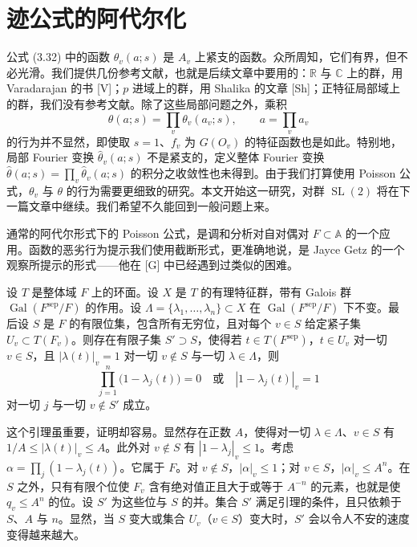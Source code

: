 \section{迹公式的阿代尔化}

公式 (3.32) 中的函数 $\theta_v(a;s)$ 是 $A_v$ 上紧支的函数。众所周知，它们有界，但不必光滑。我们提供几份参考文献，也就是后续文章中要用的：$\mathbb R$ 与 $\mathbb C$ 上的群，用 Varadarajan 的书 [V]；$p$ 进域上的群，用 Shalika 的文章 [Sh]；正特征局部域上的群，我们没有参考文献。除了这些局部问题之外，乘积
\[
\theta(a;s)=\prod_v\theta_v(a_v;s),\qquad a=\prod_va_v
\]
的行为并不显然，即使取 $s=1$、$f_v$ 为 $G(O_v)$ 的特征函数也是如此。特别地，局部 Fourier 变换 $\hat\theta_v(a;s)$ 不是紧支的，定义整体 Fourier 变换 $\hat\theta(a;s)=\prod_v\hat\theta_v(a;s)$ 的积分之收敛性也未得到。由于我们打算使用 Poisson 公式，$\theta_v$ 与 $\theta$ 的行为需要更细致的研究。本文开始这一研究，对群 $\operatorname{SL}(2)$ 将在下一篇文章中继续。我们希望不久能回到一般问题上来。

通常的阿代尔形式下的 Poisson 公式，是调和分析对自对偶对 $F\subset\mathbb A$ 的一个应用。函数的恶劣行为提示我们使用截断形式，更准确地说，是 Jayce Getz 的一个观察所提示的形式——他在 [G] 中已经遇到过类似的困难。

\begin{lemma}
\setcounter{theorem}{0}
设 $T$ 是整体域 $F$ 上的环面。设 $X$ 是 $T$ 的有理特征群，带有 Galois 群 $\operatorname{Gal}(F^{\mathrm{sep}}/F)$ 的作用。设 $\Lambda=\{\lambda_1,\dots,\lambda_n\}\subset X$ 在 $\operatorname{Gal}(F^{\mathrm{sep}}/F)$ 下不变。最后设 $S$ 是 $F$ 的有限位集，包含所有无穷位，且对每个 $v\in S$ 给定紧子集 $U_v\subset T(F_v)$。则存在有限子集 $S'\supset S$，使得若 $t\in T(F^{\mathrm{sep}})$，$t\in U_v$ 对一切 $v\in S$，且 $|\lambda(t)|_v=1$ 对一切 $v\notin S$ 与一切 $\lambda\in\Lambda$，则
\[
\prod_{j=1}^n\bigl(1-\lambda_j(t)\bigr)=0
\quad\text{或}\quad
|1-\lambda_j(t)|_v=1
\]
对一切 $j$ 与一切 $v\notin S'$ 成立。
\end{lemma}

这个引理虽重要，证明却容易。显然存在正数 $A$，使得对一切 $\lambda\in\Lambda$、$v\in S$ 有 $1/A\le|\lambda(t)|_v\le A$。此外对 $v\notin S$ 有 $|1-\lambda_j|_v\le1$。考虑 $\alpha=\prod_j(1-\lambda_j(t))$。它属于 $F$。对 $v\notin S$，$|\alpha|_v\le1$；对 $v\in S$，$|\alpha|_v\le A^n$。在 $S$ 之外，只有有限个位使 $F_v$ 含有绝对值正且大于或等于 $A^{-n}$ 的元素，也就是使 $q_v\le A^n$ 的位。设 $S'$ 为这些位与 $S$ 的并。集合 $S'$ 满足引理的条件，且只依赖于 $S$、$A$ 与 $n$。显然，当 $S$ 变大或集合 $U_v$（$v\in S$）变大时，$S'$ 会以令人不安的速度变得越来越大。

